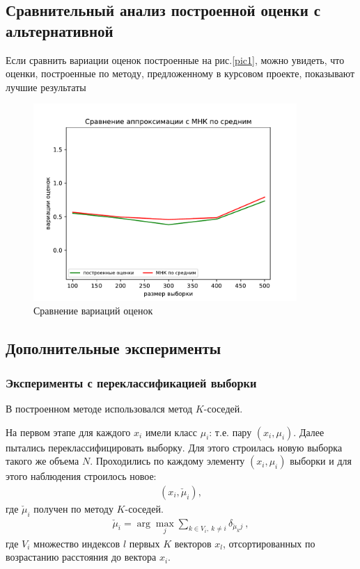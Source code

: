 \subsection{Сравнительный анализ построенной оценки с альтернативной}
Если сравнить вариации оценок построенные на рис.\ref{pic1}, можно увидеть, что оценки, построенные по методу, предложенному в курсовом проекте, показывают лучшие результаты
\vspace{4cm}
\begin{figure}[h!]
    \centering
    \includegraphics[width=100mm]{../images/OLS_GEM.pdf}
    \caption{Сравнение вариаций оценок\label{overflow}}
    \label{pic0}
\end{figure}

\newpage
\subsection{Дополнительные эксперименты}
\subsubsection{Эксперименты с переклассификацией выборки}\label{ss3_3_1}
В построенном методе использовался метод $K$-соседей.

На первом этапе для каждого $x_i$ имели класс $\mu_i$: т.е. пару $(x_i,\mu_i)$.
Далее пытались переклассифицировать выборку. 
Для этого строилась новую выборка такого же объема $N$.
Проходились по каждому элементу $(x_i, \mu_i)$ выборки и для этого наблюдения строилось новое:
\begin{eqnarray}
    (x_i, \check{\mu}_i),
\end{eqnarray}
где $\check{\mu}_i$ получен по методу $K$-соседей.\hfill\break
\begin{eqnarray}
    \check{\mu}_i = \arg\max_j \sum_{k \in V_i,~k\neq i} \delta_{\check{\mu}_k j}~,
\end{eqnarray}
где $V_i$ множество индексов $l$ первых $K$ векторов $x_l$, отсортированных по возрастанию расстояния до вектора $x_i$.

